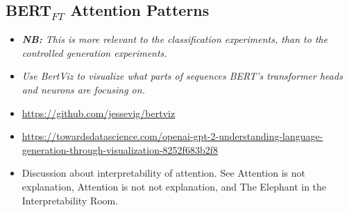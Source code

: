 

\subsection{BERT$_{FT}$ Attention Patterns}

\begin{itemize}
    \item \textit{\textbf{NB:} This is more relevant to the classification experiments, than to the controlled generation experiments.}
    
    \item \textit{Use BertViz \citep{vig-2019-multiscale} to visualize what parts of sequences BERT's transformer heads and neurons are focusing on.}
    
    \item \url{https://github.com/jessevig/bertviz}
    
    \item \url{https://towardsdatascience.com/openai-gpt-2-understanding-language-generation-through-visualization-8252f683b2f8}
    
    \item Discussion about interpretability of attention. See Attention is not explanation, Attention is not not explanation, and The Elephant in the Interpretability Room.
\end{itemize}


